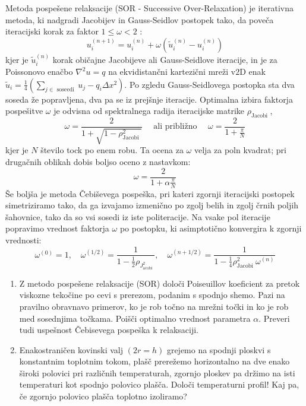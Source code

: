 Metoda pospešene relaksacije (SOR - Successive Over-Relaxation) je iterativna metoda, ki nadgradi Jacobijev in Gauss-Seidlov postopek tako, da poveča iteracijski korak za faktor $1 \leq \omega<2$ :
$$
u_{i}^{(n+1)}=u_{i}^{(n)}+\omega\left(\tilde{u}_{i}^{(n)}-u_{i}^{(n)}\right)
$$
kjer je $\tilde{u}_{i}^{(n)}$ korak običajne Jacobijeve ali Gauss-Seidlove iteracije, in je za Poissonovo enačbo $\nabla^{2} u=q$ na ekvidistančni kartezični mreži $\mathrm{v} 2 \mathrm{D}$ enak $\tilde{u}_{i}=\frac{1}{4}\left(\sum_{j \in \text { soseedi }} u_{j}-q_{i} \Delta x^{2}\right) .$ Po zgledu Gauss-Seidlovega postopka sta dva soseda že popravljena, dva pa se iz prejšnje iteracije. Optimalna izbira faktorja pospešitve $\omega$ je odvisna od spektralnega radija iteracijske matrike $\rho_{\text {Jacobi }}$,
$$
\omega=\frac{2}{1+\sqrt{1-\rho_{\text {Jacobi }}^{2}}} \quad \text { ali približno } \quad \omega=\frac{2}{1+\frac{\pi}{N}}
$$
kjer je $N$ število tock po enem robu. Ta ocena za $\omega$ velja za poln kvadrat; pri drugačnih oblikah dobis boljso oceno z nastavkom:
$$
\omega=\frac{2}{1+\alpha \frac{\pi}{N}}
$$
Še boljša je metoda Čebiševega pospeška, pri kateri zgornji iteracijski postopek simetriziramo tako, da ga izvajamo izmenično po zgolj belih in zgolj črnih poljih šahovnice, tako da so vsi sosedi iz iste politeracije. Na vsake pol iteracije popravimo vrednost faktorja $\omega$ po postopku, ki asimptotično konvergira k zgornji vrednosti:
$$
\omega^{(0)}=1, \quad \omega^{(1 / 2)}=\frac{1}{1-\frac{1}{2} \rho_{J_{\text {acobi }}^{2}}}, \quad \omega^{(n+1 / 2)}=\frac{1}{1-\frac{1}{4} \rho_{\text {Jacobi }}^{2} \omega^{(n)}}
$$

\begin{enumerate}
    \item
Z metodo pospešene relaksacije (SOR) določi Poiseuillov koeficient za pretok viskozne tekočine po cevi s prerezom, podanim s spodnjo shemo. Pazi na pravilno obravnavo primerov, ko je rob točno na mrežni točki in ko je rob med sosednjima točkama.
Poišči optimalno vrednost parametra $\alpha$. Preveri tudi uspešnost Čebisevega pospeška k relaksaciji.
\item
Enakostraničen kovinski valj $(2 r=h)$ grejemo na spodnji ploskvi s konstantnim toplotnim tokom, plašč prerežemo horizontalno na dve enako široki polovici pri različnih temperaturah, zgornjo ploskev pa držimo na isti temperaturi kot spodnjo polovico plašča.
Določi temperaturni profil!
Kaj pa, če zgornjo polovico plašča toplotno izoliramo?
\end{enumerate}